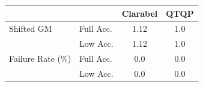 \begin{tabular}{|l|l|c|c|}
  \hline
   &  & \textbf{Clarabel} & \textbf{QTQP} \\
  \hline
  Shifted GM & Full Acc. & 1.12 & 1.0 \\
   & Low Acc. & 1.12 & 1.0 \\
  Failure Rate (\%) & Full Acc. & 0.0 & 0.0 \\
   & Low Acc. & 0.0 & 0.0 \\
  \hline
\end{tabular}
